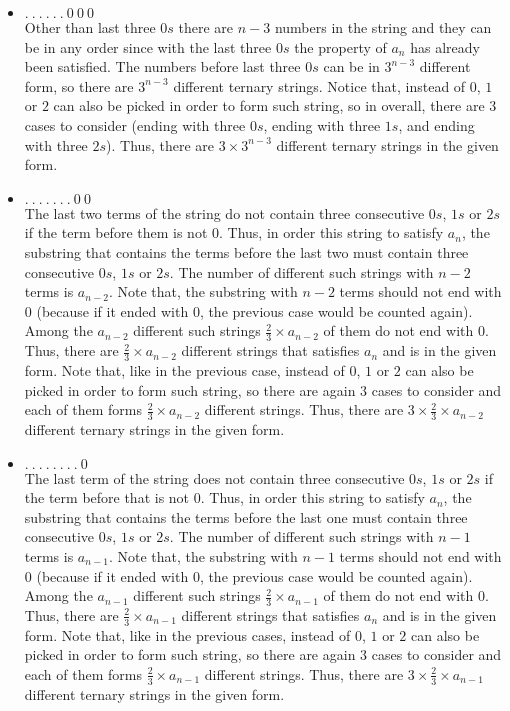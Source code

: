 \documentclass[12pt]{article}
\begin{document}
\begin{itemize}
    \item $. \ . \ . \ . \ . \ . \ 0 \ 0 \ 0$ \\
        Other than last three $0s$ there are $n-3$ numbers in the string and they can be in any order since with the last three $0s$ the property of $a_n$ has already been satisfied. The numbers before last three $0s$ can be in $3^{n - 3}$ different form, so there are $3^{n - 3}$ different ternary strings. Notice that, instead of $0$, $1$ or $2$ can also be picked in order to form such string, so in overall, there are $3$ cases to consider (ending with three $0s$, ending with three $1s$, and ending with three $2s$). Thus, there are $3 \times 3^{n - 3}$ different ternary strings in the given form.
    \item $. \ . \ . \ . \ . \ . \ . \ 0 \ 0$ \\
        The last two terms of the string do not contain three consecutive $0s$, $1s$ or $2s$ if the term before them is not $0$. Thus, in order this string to satisfy $a_n$, the substring that contains the terms before the last two must contain three consecutive $0s$, $1s$ or $2s$. The number of different such strings with $n - 2$ terms is $a_{n - 2}$. Note that, the substring with $n - 2$ terms should not end with $0$ (because if it ended with $0$, the previous case would be counted again). Among the $a_{n - 2}$ different such strings $\frac{2}{3} \times a_{n - 2}$ of them do not end with $0$. Thus, there are $\frac{2}{3} \times a_{n - 2}$ different strings that satisfies $a_n$ and is in the given form. Note that, like in the previous case, instead of $0$, $1$ or $2$ can also be picked in order to form such string, so there are again $3$ cases to consider and each of them forms $\frac{2}{3} \times a_{n - 2}$ different strings. Thus, there are $3 \times \frac{2}{3} \times a_{n - 2}$ different ternary strings in the given form.
    \item $. \ . \ . \ . \ . \ . \ . \ . \ 0$ \\
        The last term of the string does not contain three consecutive $0s$, $1s$ or $2s$ if the term before that is not $0$. Thus, in order this string to satisfy $a_n$, the substring that contains the terms before the last one must contain three consecutive $0s$, $1s$ or $2s$. The number of different such strings with $n - 1$ terms is $a_{n - 1}$. Note that, the substring with $n - 1$ terms should not end with $0$ (because if it ended with $0$, the previous case would be counted again). Among the $a_{n - 1}$ different such strings $\frac{2}{3} \times a_{n - 1}$ of them do not end with $0$. Thus, there are $\frac{2}{3} \times a_{n - 1}$ different strings that satisfies $a_n$ and is in the given form. Note that, like in the previous cases, instead of $0$, $1$ or $2$ can also be picked in order to form such string, so there are again $3$ cases to consider and each of them forms $\frac{2}{3} \times a_{n - 1}$ different strings. Thus, there are $3 \times \frac{2}{3} \times a_{n - 1}$ different ternary strings in the given form.
\end{itemize}
\end{document}
